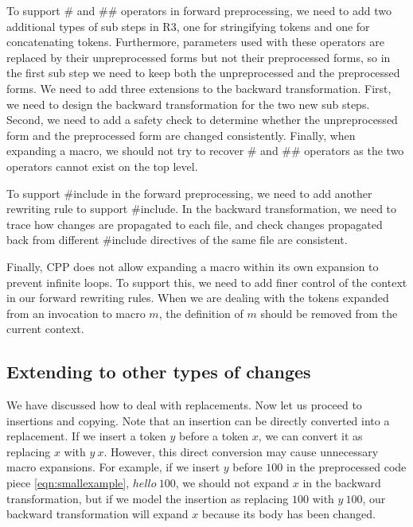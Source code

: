 To support \# and \#\# operators in forward preprocessing, we need to add
two additional types of sub steps in R3, one for stringifying tokens
and one for concatenating tokens. Furthermore, parameters used with
these operators are replaced by their unpreprocessed forms but not their
preprocessed forms, so in the first sub step we need to keep both the
unpreprocessed and the preprocessed forms. %
We need to add three extensions to the backward transformation. First,
we need to design the backward transformation for the two new sub
steps. Second, we need to add a safety check to determine whether the
unpreprocessed form and the preprocessed form are changed
consistently. Finally, when expanding a macro, we should not try to
recover \# and \#\# operators as the two operators cannot exist on the
top level.

To support \#include in the forward preprocessing, we need to add
another rewriting rule to support \#include. In the backward
transformation, we need to trace how changes are propagated to each
file, and check changes propagated back from different \#include
directives of the same file are consistent.

Finally, %
CPP does not allow expanding a macro within its own expansion to prevent
infinite loops. 
To support this, we need to add finer
control of the context in our forward rewriting rules. When we are
dealing with the tokens expanded from an invocation to macro $m$, the
definition of $m$ should be removed from the current context.

\subsection{Extending to other types of changes}\label{sec:extend-other-changes}
We have discussed how to deal with replacements. Now let us proceed to
insertions and copying. Note that an insertion can be directly
converted into a replacement. If we insert a token $y$ before a token
$x$, we can convert it as replacing $x$ with $y\ x$. However, this
direct conversion may cause unnecessary macro expansions. For example,
if we insert $y$ before $100$ in the preprocessed code piece
\ref{eqn:smallexample}, $hello\ 100$, we should not expand $x$ in
the backward transformation, but if we model the insertion as
replacing $100$ with $y\ 100$, our backward transformation will expand
$x$ because its body has been changed.


